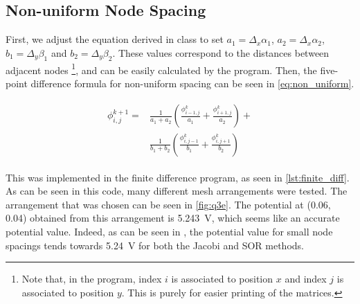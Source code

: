 \documentclass[a4paper,titlepage]{article}
\begin{document}
	\subsection{Non-uniform Node Spacing}
	
	First, we adjust the equation derived in class to set $a_1 = \Delta_x\alpha_1$, $a_2 = \Delta_x\alpha_2$, $b_1 = \Delta_y\beta_1$ and $b_2 = \Delta_y\beta_2$. These values correspond to the distances between adjacent nodes \footnote{Note that, in the program, index $i$ is associated to position $x$ and index $j$ is associated to position $y$. This is purely for easier printing of the matrices.}, and can be easily calculated by the program. Then, the five-point difference formula for non-uniform spacing can be seen in \autoref{eq:non_uniform}.
	
	\begin{align} \label{eq:non_uniform}
		\begin{split}
			\phi^{k + 1}_{i,j} = 
			&\frac{1}{a_1 + a_2}\left(\frac{\phi^k_{i - 1,j}}{a_1} + \frac{\phi^k_{i + 1,j}}{a_2}\right) + \\
			&\frac{1}{b_1 + b_2}\left(\frac{\phi^k_{i, j - 1}}{b_1} + \frac{\phi^k_{i, j + 1}}{b_2}\right)
		\end{split}
	\end{align}
	
	This was implemented in the finite difference program, as seen in \autoref{lst:finite_diff}. As can be seen in this code, many different mesh arrangements were tested. The arrangement that was chosen can be seen in \autoref{fig:q3e}. The potential at (0.06, 0.04) obtained from this arrangement is \SI{5.243}{\volt}, which seems like an accurate potential value. Indeed, as can be seen in , the potential value for small node spacings tends towards \SI{5.24}{\volt} for both the Jacobi and SOR methods.
	
\end{document}
